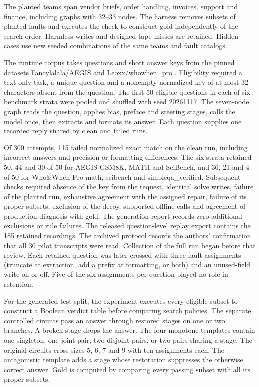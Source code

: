 \documentclass[11pt,letterpaper]{article}
\begin{document}
The planted teams span vendor briefs, order handling, invoices, support and finance, including graphs with 32--33 nodes. The harness removes subsets of planted faults and executes the check to construct gold independently of the search order. Harmless writes and designed tape misses are retained. Hidden cases use new seeded combinations of the same teams and fault catalogs.

The runtime corpus takes questions and short answer keys from the pinned datasets \href{https://huggingface.co/datasets/Fancylalala/AEGIS/tree/b936269a5143e4450242d8628bff026bdc5bae18}{Fancylalala/AEGIS} and \href{https://huggingface.co/datasets/Leoxx/whowhen_pro/tree/0bd196c8a040841c4ae167ab33cc8151de246f1f}{Leoxx/whowhen\_pro} \cite{aegis,pro}. Eligibility required a text-only task, a unique question and a nonempty normalized key of at most 32 characters absent from the question. The first 50 eligible questions in each of six benchmark strata were pooled and shuffled with seed 20261117. The seven-node graph reads the question, applies bias, preface and steering stages, calls the model once, then extracts and formats its answer. Each question supplies one recorded reply shared by clean and failed runs.

Of 300 attempts, 115 failed normalized exact match on the clean run, including incorrect answers and precision or formatting differences. The six strata retained 50, 44 and 30 of 50 for AEGIS GSM8K, MATH and SciBench, and 36, 21 and 4 of 50 for Who\&When Pro math, scibench and simpleqa\_verified. Subsequent checks required absence of the key from the request, identical solve writes, failure of the planted run, exhaustive agreement with the assigned repair, failure of its proper subsets, exclusion of the decoy, supported offline calls and agreement of production diagnosis with gold. The generation report records zero additional exclusions or rule failures. The released question-level replay export contains the 185 retained recordings. The archived protocol records the authors' confirmation that all 30 pilot transcripts were read. Collection of the full run began before that review. Each retained question was later crossed with three fault assignments (truncate at extraction, add a prefix at formatting, or both) and an unused-field write on or off. Five of the six assignments per question played no role in retention.

For the generated test split, the experiment executes every eligible subset to construct a Boolean verdict table before comparing search policies. The separate controlled circuits pass an answer through restored stages on one or two branches. A broken stage drops the answer. The four monotone templates contain one singleton, one joint pair, two disjoint pairs, or two pairs sharing a stage. The original circuits cross sizes 5, 6, 7 and 9 with ten assignments each. The antagonistic template adds a stage whose restoration suppresses the otherwise correct answer. Gold is computed by comparing every passing subset with all its proper subsets.
\end{document}
